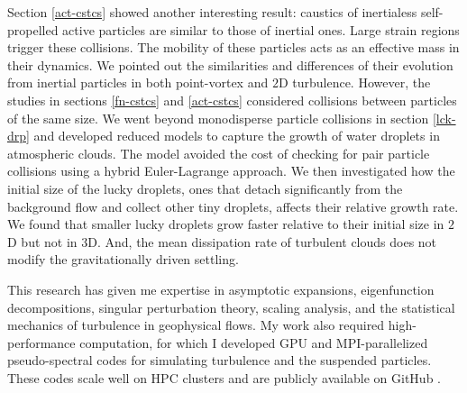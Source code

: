 \documentclass[../Rajarshi-thesis-draft.tex]{subfiles}
\begin{document}
Section \ref{act-cstcs} showed another interesting result: caustics of inertialess self-propelled active particles are similar to those of inertial ones. Large strain regions trigger these collisions. The mobility of these particles acts as an effective mass in their dynamics. We pointed out the similarities and differences of their evolution from inertial particles in both point-vortex and $2$D turbulence. 
However, the studies in sections \ref{fn-cstcs} and \ref{act-cstcs} considered collisions between particles of the same size. We went beyond monodisperse particle collisions in section \ref{lck-drp} and developed reduced models to capture the growth of water droplets in atmospheric clouds. The model avoided the cost of checking for pair particle collisions using a hybrid Euler-Lagrange approach. We then investigated how the initial size of the lucky droplets, ones that detach significantly from the background flow and collect other tiny droplets, affects their relative growth rate. We found that smaller lucky droplets grow faster relative to their initial size in $2$D but not in $3$D. And, the mean dissipation rate of turbulent clouds does not modify the gravitationally driven settling. 

This research has given me expertise in asymptotic expansions, eigenfunction decompositions, singular perturbation theory, scaling analysis, and the statistical mechanics of turbulence in geophysical flows. My work also required high-performance computation, for which I developed GPU and MPI-parallelized pseudo-spectral codes for simulating turbulence and the suspended particles. These codes scale well on HPC clusters and are publicly available on GitHub \cite{githubrepo}. 
\end{document}
